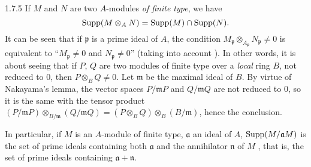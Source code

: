 \documentclass[../main.tex]{subfiles}
\begin{document}
\begin{env}{1.7.5}
If $M$ and $N$ are two $A$-modules \emph{of finite type}, we have
\[
  \operatorname{Supp}(M\otimes_A N)=\operatorname{Supp}(M)\cap\operatorname{Supp}(N).
\]
It can be seen that if $\mathfrak{p}$ is a prime ideal of $A$, the condition
$M_\mathfrak{p}\otimes_{A_\mathfrak{p}}N_\mathfrak{p}\neq 0$ is equivalent to
``$M_\mathfrak{p}\neq 0$ and $N_\mathfrak{p}\neq 0$'' (taking into account ). In
other words, it is about seeing that if $P$, $Q$ are two modules of finite type
over a \emph{local} ring $B$, not reduced to $0$, then $P\otimes_B Q\neq 0$. Let
$\mathfrak{m}$ be the maximal ideal of $B$. By virtue of Nakayama's lemma, the vector
spaces $P/\mathfrak{m}P$ and $Q/\mathfrak{m}Q$ are not reduced to $0$, so it is the same with
the tensor product
$(P/\mathfrak{m}P)\otimes_{B/\mathfrak{m}}(Q/\mathfrak{m}Q)=(P\otimes_B Q)\otimes_B(B/\mathfrak{m})$,
hence the conclusion.

In particular, if $M$ is an $A$-module of finite type, $\mathfrak{a}$ an ideal of $A$,
$\operatorname{Supp}(M/\mathfrak{a}M)$ is the set of prime ideals containing both $\mathfrak{a}$ and the
annihilator $\mathfrak{n}$ of $M$ , that is, the set of prime ideals containing
$\mathfrak{a}+\mathfrak{n}$.
\end{env}
\end{document}
